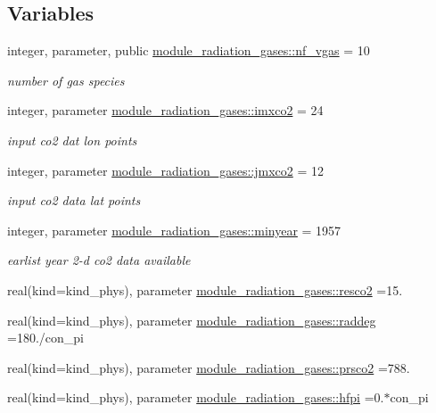 \subsection*{Variables}
\begin{DoxyCompactItemize}
\item 
integer, parameter, public \hyperlink{group__module__radiation__gases_gaffc350828412da77ff3cf3e617ddc66c}{module\+\_\+radiation\+\_\+gases\+::nf\+\_\+vgas} = 10
\begin{DoxyCompactList}\small\item\em number of gas species \end{DoxyCompactList}\item 
integer, parameter \hyperlink{group__module__radiation__gases_ga46eb4079ff9932819b3ab133bf6a43d9}{module\+\_\+radiation\+\_\+gases\+::imxco2} = 24
\begin{DoxyCompactList}\small\item\em input co2 dat lon points \end{DoxyCompactList}\item 
integer, parameter \hyperlink{group__module__radiation__gases_gaa56e209872093bfcbdaeb452f5e5e332}{module\+\_\+radiation\+\_\+gases\+::jmxco2} = 12
\begin{DoxyCompactList}\small\item\em input co2 data lat points \end{DoxyCompactList}\item 
integer, parameter \hyperlink{group__module__radiation__gases_ga3b26af64187b57999cadeced419b0f1b}{module\+\_\+radiation\+\_\+gases\+::minyear} = 1957
\begin{DoxyCompactList}\small\item\em earlist year 2-\/d co2 data available \end{DoxyCompactList}\item 
real(kind=kind\+\_\+phys), parameter \hyperlink{group__module__radiation__gases_gafda5c1d1129d865b9772e0f58dea7598}{module\+\_\+radiation\+\_\+gases\+::resco2} =15.
\item 
real(kind=kind\+\_\+phys), parameter \hyperlink{group__module__radiation__gases_gaa5873ae54e950001ff873771378e7a1e}{module\+\_\+radiation\+\_\+gases\+::raddeg} =180./con\+\_\+pi
\item 
real(kind=kind\+\_\+phys), parameter \hyperlink{group__module__radiation__gases_gab09dc05b8a02e9a0b56991508b599708}{module\+\_\+radiation\+\_\+gases\+::prsco2} =788.
\item 
real(kind=kind\+\_\+phys), parameter \hyperlink{group__module__radiation__gases_gab99c75954c59ed92a52de94ca6113f73}{module\+\_\+radiation\+\_\+gases\+::hfpi} =0.$\ast$con\+\_\+pi

\end{DoxyCompactItemize}
